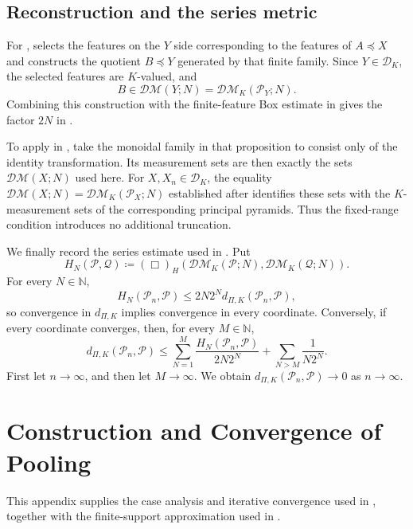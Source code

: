 \documentclass[11pt]{amsart}
\theoremstyle{plain}
\theoremstyle{definition}
\theoremstyle{remark}
\newcommand{\DK}{\mathcal D_K}
\newcommand{\DM}{\mathcal{DM}}
\begin{document}
\subsection{Reconstruction and the series metric}
\label{subsec:app-pyramid-reconstruction}

For , \cite[Lemma~6.10]{gds2} selects the features on the $Y$ side corresponding to the features of $A\preceq X$ and constructs the quotient $B\preceq Y$ generated by that finite family. Since $Y\in\DK$, the selected features are $K$-valued, and
\[
B\in\DM(Y;N)=\DM_K(\mathcal P_Y;N).
\]
Combining this construction with the finite-feature Box estimate in \cite[Proposition~6.8]{gds2} gives the factor $2N$ in .

To apply \cite[Proposition~6.24]{gds2} in , take the monoidal family in that proposition to consist only of the identity transformation. Its measurement sets are then exactly the sets $\DM(X;N)$ used here. For $X,X_n\in\DK$, the equality $\DM(X;N)=\DM_K(\mathcal P_X;N)$ established after  identifies these sets with the $K$-measurement sets of the corresponding principal pyramids. Thus the fixed-range condition introduces no additional truncation.

We finally record the series estimate used in . Put
\[
H_N(\mathcal P,\mathcal Q)\coloneqq(\Box)_H(\DM_K(\mathcal P;N),\DM_K(\mathcal Q;N)).
\]
For every $N\in\mathbb N$,
\[
H_N(\mathcal P_n,\mathcal P)\leq2N2^N d_{\Pi,K}(\mathcal P_n,\mathcal P),
\]
so convergence in $d_{\Pi,K}$ implies convergence in every coordinate. Conversely, if every coordinate converges, then, for every $M\in\mathbb N$,
\[
d_{\Pi,K}(\mathcal P_n,\mathcal P)\leq\sum_{N=1}^{M}\frac{H_N(\mathcal P_n,\mathcal P)}{2N2^N}+\sum_{N>M}\frac{1}{N2^N}.
\]
First let $n\to\infty$, and then let $M\to\infty$. We obtain $d_{\Pi,K}(\mathcal P_n,\mathcal P)\to0$ as $n\to\infty$.

\section{Construction and Convergence of Pooling}
\label{app:pooling}

This appendix supplies the case analysis and iterative convergence used in , together with the finite-support approximation used in .
\end{document}
